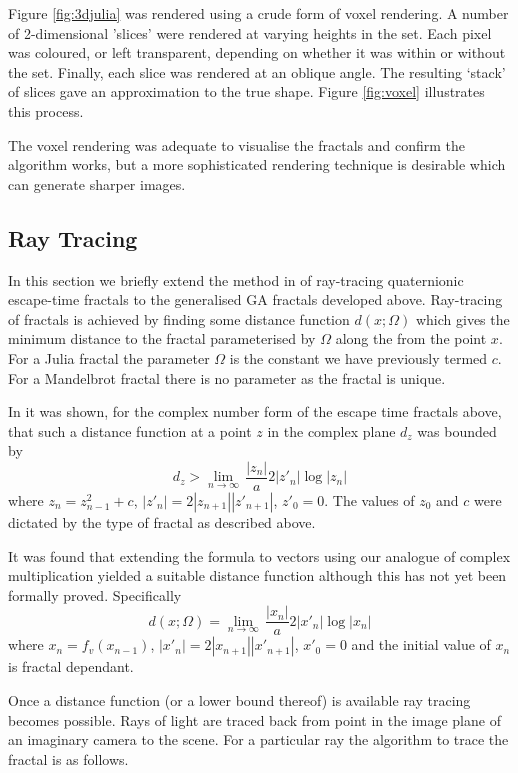 Figure \ref{fig:3djulia} was rendered using a crude form of voxel rendering. A
number of 2-dimensional 'slices' were rendered at varying heights in the set. Each
pixel was coloured, or left transparent, depending on whether it was within or without
the set. Finally, each slice was rendered at an oblique angle. The resulting
`stack' of slices gave an approximation to the true shape. Figure
\ref{fig:voxel} illustrates this process.

The voxel rendering was adequate to visualise the fractals and confirm the algorithm
works, but a more sophisticated rendering technique is desirable which can generate
sharper images.

\subsection{Ray Tracing}

In this section we briefly extend the method in \cite{FRAC:HypercomplexIterations} of 
ray-tracing quaternionic escape-time fractals to the generalised GA fractals developed 
above. Ray-tracing of fractals is achieved by finding some distance function
$d(x;\Omega)$ which gives the minimum distance to the fractal parameterised by
$\Omega$ along the from the point $x$. For a Julia fractal the
parameter $\Omega$ is the constant we have previously termed $c$. For a Mandelbrot fractal there is no
parameter as the fractal is unique. 

In \cite{FRAC:HypercomplexIterations} it was shown, for the complex number
form of the escape time fractals above, that such a distance function
at a point $z$ in the complex plane $d_z$ was bounded by
\[
d_z > \lim_{n \rightarrow \infty}\,\frac{|z_n|}a{2|z'_n|}\log|z_n|
\]
where $z_n = z_{n-1}^2 + c$, $|z'_n| = 2|z_{n+1}||z'_{n+1}|$, $z'_0 = 0$.
The values of $z_0$ and $c$ were dictated by the type of fractal as described above.

It was found that extending the formula to vectors using our analogue of
complex multiplication yielded a suitable distance function although this has not
yet been formally proved. Specifically
\[
d(x; \Omega) = \lim_{n \rightarrow \infty}\,\frac{|x_n|}a{2|x'_n|}\log|x_n|
\]
where $x_n = f_v(x_{n-1})$, $|x'_n| = 2|x_{n+1}||x'_{n+1}|$, $x'_0 = 0$ and
the initial value of $x_n$ is fractal dependant. 

Once a distance function (or a lower bound thereof) is available ray tracing
becomes possible. Rays of light are traced back from point in the image
plane of an imaginary camera to the scene. For a particular ray the algorithm
to trace the fractal is as follows.

